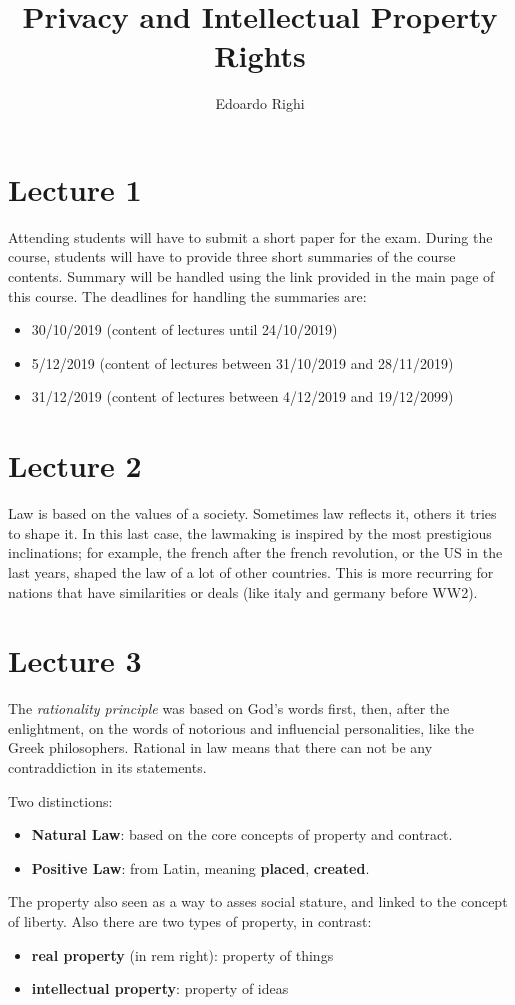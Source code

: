 \documentclass[a4paper, 10pt, titlepage]{article}
\begin{document}
\title{Privacy and Intellectual Property Rights}
\author{Edoardo Righi}
\maketitle
\section{Lecture 1}
Attending students will have to submit a short paper for the exam.
During the course, students will have to provide three short summaries of the course contents. Summary will be handled using the link provided in the main page of this course. The deadlines for handling the summaries are:
\begin{itemize}
\item 30/10/2019 (content of lectures until 24/10/2019)
\item 5/12/2019 (content of lectures between 31/10/2019 and 28/11/2019)
\item 31/12/2019 (content of lectures between 4/12/2019 and 19/12/2099)
\end{itemize}

\section{Lecture 2}
Law is based on the values of a society. Sometimes law reflects it, others it tries to shape it. In this last case, the lawmaking is inspired by the most prestigious inclinations; for example, the french after the french revolution, or the US in the last years, shaped the law of a lot of other countries. This is more recurring for nations that have similarities or deals (like italy and germany before WW2).

\section{Lecture 3}
The \textit{rationality principle} was based on God's words first, then, after the enlightment, on the words of notorious and influencial personalities, like the Greek philosophers. Rational in law means that there can not be any contraddiction in its statements.

Two distinctions:
\begin{itemize}
\item \textbf{Natural Law}: based on the core concepts of property and contract.
\item \textbf{Positive Law}: from Latin, meaning \textbf{placed}, \textbf{created}.
\end{itemize}
The property also seen as a way to asses social stature, and linked to the concept of liberty.
Also there are two types of property, in contrast:
\begin{itemize}
\item \textbf{real property} (in rem right): property of things
\item \textbf{intellectual property}: property of ideas
\end{itemize}
\end{document}
